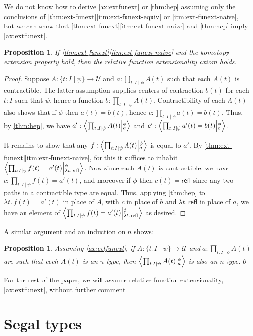 \documentclass{amsart}
\theoremstyle{plain}
\newtheorem{prop}[thm]{Proposition}
\theoremstyle{definition}
\theoremstyle{remark}
\numberwithin{equation}{section}
\newcommand{\tprod}{\textstyle\prod}
\newcommand{\exten}[4]{\left\langle\mathchoice{\textstyle\prod_{#1}}{\textstyle\prod_{#1}}{\scriptstyle\prod_{#1}}{\scriptscriptstyle\prod_{#1}} #2 \middle|^{#3}_{#4}\right\rangle}
\newcommand{\univtype}{\mathcal{U}}
\newcommand{\sh}[2]{\{#1\mid #2\}}
\newcommand{\refl}{\mathsf{refl}}
\newcommand{\lam}[1]{\lambda #1.\,}
\begin{document}
We do not know how to derive \cref{ax:extfunext} or \cref{thm:hep} assuming only the conclusions of \cref{thm:ext-funext}\ref{itm:ext-funext-equiv} or \ref{itm:ext-funext-naive}, but we can show that  \cref{thm:ext-funext}\ref{itm:ext-funext-naive} and  \cref{thm:hep} imply  \cref{ax:extfunext}.

\begin{prop}
If \cref{thm:ext-funext}\ref{itm:ext-funext-naive} and the homotopy extension property hold, then the relative function extensionality axiom holds.
\end{prop}
\begin{proof}
  Suppose $A:\sh{t:I}{\psi}\to\univtype$ and $a:\tprod_{t:I\mid\phi} A(t)$ such that each $A(t)$ is contractible.
  The latter assumption supplies centers of contraction $b(t)$ for each $t:I$ such that $\psi$, hence a function $b:\tprod_{t:I\mid\psi} A(t)$.
  Contractibility of each $A(t)$ also shows that if $\phi$ then $a(t)=b(t)$, hence $e:\tprod_{t:I\mid\phi} a(t) = b(t)$.
  Thus, by \cref{thm:hep}, we have $a':\exten{t:I\mid\psi}{A(t)}{\phi}{a}$ and $e':\exten{t:I\mid\psi}{a'(t)=b(t)}{\phi}{e}$.

  It remains to show that any $f:\exten{t:I\mid\psi}{A(t)}{\phi}{a}$ is equal to $a'$.
  By \cref{thm:ext-funext}\ref{itm:ext-funext-naive}, for this it suffices to inhabit $\exten{t:I\mid\psi}{f(t)=a'(t)}{\phi}{\lam{t}\refl}$.
  Now since each $A(t)$ is contractible, we have $c:\tprod_{t:I\mid\psi} f(t)=a'(t)$, and moreover if $\phi$ then $c(t) = \refl$ since any two paths in a contractible type are equal.
  Thus, applying \cref{thm:hep} to $\lam{t} f(t)=a'(t)$ in place of $A$, with $c$ in place of $b$ and $\lam{t}\refl$ in place of $a$, we have an element of $\exten{t:I\mid\psi}{f(t)=a'(t)}{\phi}{\lam{t}\refl}$ as desired.
\end{proof}

A similar argument and an induction on $n$ shows:

\begin{prop}
  Assuming \cref{ax:extfunext}, if $A:\sh{t:I}{\psi}\to\univtype$ and $a:\tprod_{t:I\mid\phi} A(t)$ are such that each $A(t)$ is an $n$-type, then $\exten{t:I\mid\psi}{A(t)}{\phi}{a}$ is also an $n$-type.\qed
\end{prop}

For the rest of the paper, we will assume relative function extensionality, \cref{ax:extfunext}, without further comment.


\section{Segal types}
\label{sec:Segal-types}
\end{document}
